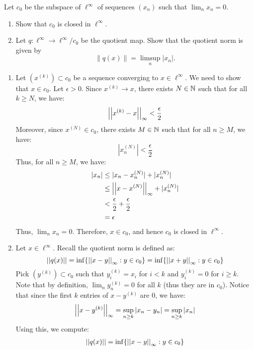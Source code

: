 \documentclass[12pt]{article}
\begin{document}
\begin{problem}{4}
    Let $c_0$ be the subspace of $\ell^\infty$ of sequences $(x_n)$ such that $\lim_n x_n = 0$.
    \begin{enumerate}
        \item Show that $c_0$ is closed in $\ell^\infty$.
        \item Let $q : \ell^\infty \to \ell^\infty / c_0$ be the quotient map. Show that the quotient norm is given by
        \[
        \|q(x)\| = \limsup_n |x_n|.
        \]
    \end{enumerate}
\end{problem}
\begin{solution}
    \bbni
    \begin{enumerate}
        \item Let $(x^{(k)}) \subset c_0$ be a sequence converging to $x \in \ell^\infty$. We need to show that $x \in c_0$. \bbni
        Let $\epsilon > 0$. Since $x^{(k)} \to x$, there exists $N \in \mathbb N$ such that for all $k \geq N$, we have:
        \[ \left\vert\left\vert x^{(k)} - x\right\vert\right\vert_\infty < \frac\epsilon 2\]
        Moreover, since $x^{(N)} \in c_0$, there exists $M \in \mathbb N$ such that for all $n \geq M$, we have: 
        \[ |x^{(N)}_n| < \frac\epsilon 2\]
        Thus, for all $n \geq M$, we have: 
        \begin{align*}
            |x_n| &\leq |x_n - x^{(N)}_n| + |x^{(N)}_n| \\
            &\leq \left\vert\left\vert x-x^{(N)}\right\vert\right\vert_\infty + |x^{(N)}_n| \\
            &< \frac\epsilon 2 + \frac\epsilon 2 \\
            &= \epsilon
        \end{align*}
        Thus, $\lim_n x_n = 0$. Therefore, $x \in c_0$, and hence $c_0$ is closed in $\ell^\infty$.
        \item Let $x \in \ell^\infty$. Recall the quotient norm is defined as: 
        \[ \left\vert\left\vert q(x)\right\vert\right\vert = \inf\{ \left\vert\left\vert x-y\right\vert\right\vert_\infty: y \in c_0 \} = \inf\{ \left\vert\left\vert x+y\right\vert\right\vert_\infty: y \in c_0 \}\]
        Pick $(y^{(k)}) \subset c_0$ such that $y_i^{(k)} = x_i$ for $i < k$ and $y_i^{(k)} = 0$ for $i \geq k$. Note that by definition, $\lim_n y^{(k)}_n = 0$ for all $k$ (thus they are in $c_0$). Notice that since the first $k$ entries of $x-y^{(k)}$ are $0$, we have:
        \[ \left\vert\left\vert x-y^{(k)}\right\vert\right\vert_\infty = \sup_{n\geq k} |x_n-y_n| = \sup_{n\geq k} |x_n|\]
        Using this, we compute: 
        \begin{align*}
            \norm{q(x)} &= \inf\{\norm{x-y}_\infty: y \in c_0\} \\

\end{align*}
\end{enumerate}
\end{solution}
\end{document}
